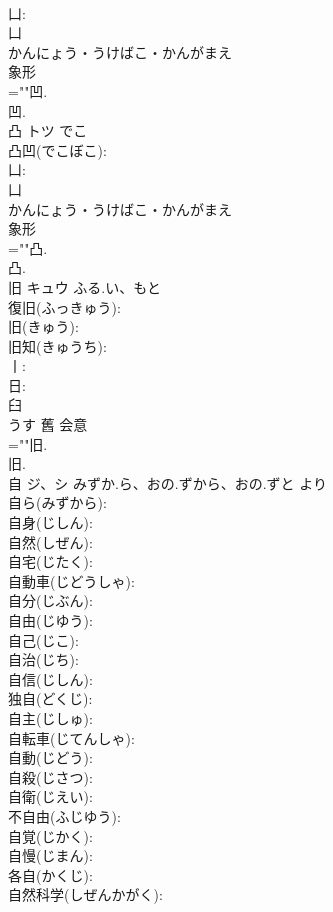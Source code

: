 \documentclass[8pt]{extreport}
\begin{document}
\begin{CJK}{UTF8}{min}
\\	凵: 
\\	凵	
\\	かんにょう・うけばこ・かんがまえ	
\\	象形 
\\	=""凹.
\\	凹.
\\	凸	トツ	でこ		
\\	凸凹(でこぼこ): 
\\	凵: 
\\	凵	
\\	かんにょう・うけばこ・かんがまえ	
\\	象形 
\\	=""凸.
\\	凸.
\\	旧	キュウ	ふる.い、もと		
\\	復旧(ふっきゅう): 
\\	旧(きゅう): 
\\	旧知(きゅうち): 
\\	丨: 
\\	日: 
\\	臼	
\\	うす	舊	会意 
\\	=""旧.
\\	旧.
\\	自	ジ、シ	みずか.ら、おの.ずから、おの.ずと	より	
\\	自ら(みずから): 
\\	自身(じしん): 
\\	自然(しぜん): 
\\	自宅(じたく): 
\\	自動車(じどうしゃ): 
\\	自分(じぶん): 
\\	自由(じゆう): 
\\	自己(じこ): 
\\	自治(じち): 
\\	自信(じしん): 
\\	独自(どくじ): 
\\	自主(じしゅ): 
\\	自転車(じてんしゃ): 
\\	自動(じどう): 
\\	自殺(じさつ): 
\\	自衛(じえい): 
\\	不自由(ふじゆう): 
\\	自覚(じかく): 
\\	自慢(じまん): 
\\	各自(かくじ): 
\\	自然科学(しぜんかがく): 

\end{CJK}
\end{document}
